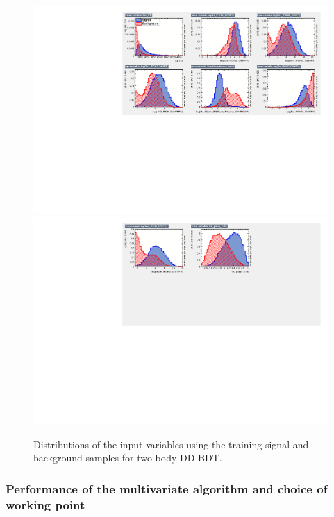 \begin{figure}
\centering
\includegraphics[width=\linewidth]{figures/selection/inputvariables_KPi_DD_run1_1.pdf}
\includegraphics[trim = 0mm 50mm 0mm 0mm, clip,width=\linewidth]{figures/selection/inputvariables_KPi_DD_run1_2.pdf}
\caption{Distributions of the input variables using the training signal and background samples for two-body DD BDT.}
\label{BDTinputdist2bodyDD}
\end{figure}

\subsubsection{Performance of the multivariate algorithm and choice of working point}

